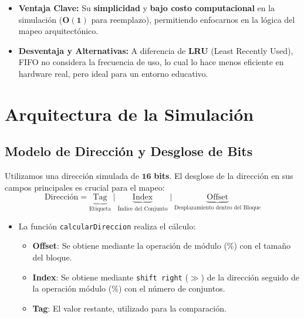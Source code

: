 \documentclass[12pt, a4paper]{article}
\begin{document}
\begin{itemize}[label=$\rightarrow$]
    \item \textbf{Ventaja Clave:} Su \textbf{simplicidad} y \textbf{bajo costo computacional} en la simulación ($\mathbf{O(1)}$ para reemplazo), permitiendo enfocarnos en la lógica del mapeo arquitectónico.
    \item \textbf{Desventaja y Alternativas:} A diferencia de \textbf{LRU} (Least Recently Used), FIFO no considera la frecuencia de uso, lo cual lo hace menos eficiente en hardware real, pero ideal para un entorno educativo.
\end{itemize}

\section{Arquitectura de la Simulación}
\label{sec:arquitectura}

\subsection{Modelo de Dirección y Desglose de Bits}
Utilizamos una dirección simulada de $\mathbf{16}$ \textbf{bits}. El desglose de la dirección en sus campos principales es crucial para el mapeo:
\[ \text{Dirección} = \underbrace{\text{Tag}}_{\text{Etiqueta}} \; \Big| \; \underbrace{\text{Index}}_{\text{Índice del Conjunto}} \; \Big| \; \underbrace{\text{Offset}}_{\text{Desplazamiento dentro del Bloque}} \]

\begin{itemize}[label=$\circ$]
    \item La función \texttt{calcularDireccion} realiza el cálculo:
    \begin{itemize}
        \item \textbf{Offset}: Se obtiene mediante la operación de módulo ($\%$) con el tamaño del bloque.
        \item \textbf{Index}: Se obtiene mediante \texttt{shift right} ($\gg$) de la dirección seguido de la operación módulo ($\%$) con el número de conjuntos.
        \item \textbf{Tag}: El valor restante, utilizado para la comparación.
    \end{itemize}
\end{itemize}
\end{document}
